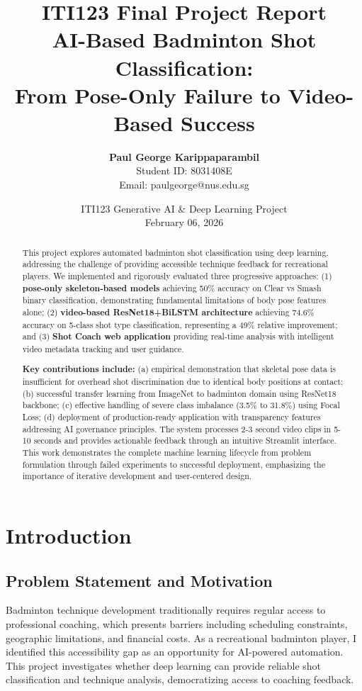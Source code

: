 \documentclass[11pt,a4paper]{article}
\title{\textbf{ITI123 Final Project Report}\\\vspace{0.3cm}AI-Based Badminton Shot Classification:\\From Pose-Only Failure to Video-Based Success}
\author{\textbf{Paul George Karippaparambil}\\Student ID: 8031408E\\Email: paulgeorge@nus.edu.sg}
\date{ITI123 Generative AI \& Deep Learning Project\\February 06, 2026}
\begin{document}
\maketitle
\thispagestyle{empty}

\begin{abstract}
This project explores automated badminton shot classification using deep learning, addressing the challenge of providing accessible technique feedback for recreational players. We implemented and rigorously evaluated three progressive approaches: (1) \textbf{pose-only skeleton-based models} achieving 50\% accuracy on Clear vs Smash binary classification, demonstrating fundamental limitations of body pose features alone; (2) \textbf{video-based ResNet18+BiLSTM architecture} achieving 74.6\% accuracy on 5-class shot type classification, representing a 49\% relative improvement; and (3) \textbf{Shot Coach web application} providing real-time analysis with intelligent video metadata tracking and user guidance.

\textbf{Key contributions include:} (a) empirical demonstration that skeletal pose data is insufficient for overhead shot discrimination due to identical body positions at contact; (b) successful transfer learning from ImageNet to badminton domain using ResNet18 backbone; (c) effective handling of severe class imbalance (3.5\% to 31.8\%) using Focal Loss; (d) deployment of production-ready application with transparency features addressing AI governance principles. The system processes 2-3 second video clips in 5-10 seconds and provides actionable feedback through an intuitive Streamlit interface. This work demonstrates the complete machine learning lifecycle from problem formulation through failed experiments to successful deployment, emphasizing the importance of iterative development and user-centered design.
\end{abstract}

\newpage
\tableofcontents
\newpage

\section{Introduction}

\subsection{Problem Statement and Motivation}

Badminton technique development traditionally requires regular access to professional coaching, which presents barriers including scheduling constraints, geographic limitations, and financial costs. As a recreational badminton player, I identified this accessibility gap as an opportunity for AI-powered automation. This project investigates whether deep learning can provide reliable shot classification and technique analysis, democratizing access to coaching feedback.
\end{document}
